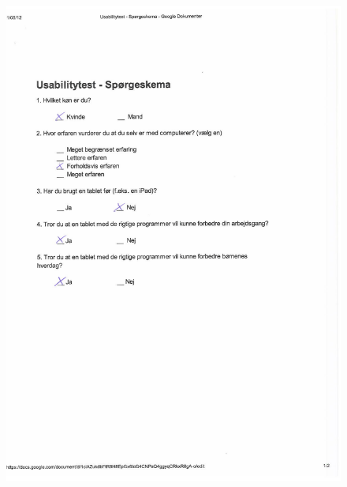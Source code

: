 \begin{figure}[H]
	\centering
		\includegraphics{Appendix/demo_t1.pdf}
	\label{fig:demo_t5}
\end{figure}

